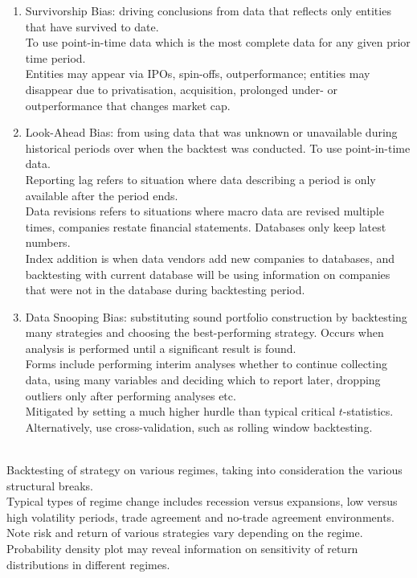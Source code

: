 \begin{remark} 
\begin{enumerate}[label=\arabic*.]
\setlength{\itemsep}{0pt}
\item Survivorship Bias: driving conclusions from data that reflects only entities that have survived to date.\\
To use point-in-time data which is the most complete data for any given prior time period.\\
Entities may appear via IPOs, spin-offs, outperformance; entities may disappear due to privatisation, acquisition, prolonged under- or outperformance that changes market cap.
\item Look-Ahead Bias: from using data that was unknown or unavailable during historical periods over when the backtest was conducted. To use point-in-time data.\\
Reporting lag refers to situation where data describing a period is only available after the period ends.\\
Data revisions refers to situations where macro data are revised multiple times, companies restate financial statements. Databases only keep latest numbers.\\
Index addition is when data vendors add new companies to databases, and backtesting with current database will be using information on companies that were not in the database during backtesting period.
\item Data Snooping Bias: substituting sound portfolio construction by backtesting many strategies and choosing the best-performing strategy. Occurs when analysis is performed until a significant result is found.\\
Forms include performing interim analyses whether to continue collecting data, using many variables and deciding which to report later, dropping outliers only after performing analyses etc.\\
Mitigated by setting a much higher hurdle than typical critical $t$-statistics.\\
Alternatively, use cross-validation, such as rolling window backtesting.
\end{enumerate}
\end{remark}

\begin{remark} \\
Backtesting of strategy on various regimes, taking into consideration the various structural breaks.\\
Typical types of regime change includes recession versus expansions, low versus high volatility periods, trade agreement and no-trade agreement environments.\\
Note risk and return of various strategies vary depending on the regime.\\
Probability density plot may reveal information on sensitivity of return distributions in different regimes.
\end{remark}

